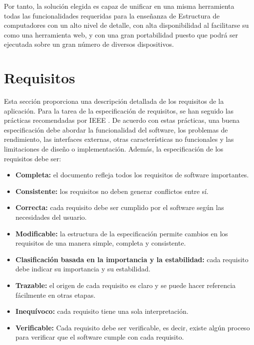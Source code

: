 Por tanto, la solución elegida es capaz de unificar en una misma herramienta todas las funcionalidades requeridas para la enseñanza de Estructura de computadores con un alto nivel de detalle, con alta disponibilidad al facilitarse su como una herramienta web, y con una gran portabilidad puesto que podrá ser ejecutada sobre un gran número de diversos dispositivos.


\section{Requisitos}
\label{sec:requirements}

Esta sección proporciona una descripción detallada de los requisitos de la aplicación. Para la tarea de la especificación de requisitos, se han seguido las prácticas recomendadas por IEEE \cite{ieee1998}. De acuerdo con estas prácticas, una buena especificación debe abordar la funcionalidad del software, los problemas de rendimiento, las interfaces externas, otras características no funcionales y las limitaciones de diseño o implementación.
Además, la especificación de los requisitos debe ser:

\begin{itemize}

\item \textbf{Completa:} el documento refleja todos los requisitos de software importantes.

\item \textbf{Consistente:} los requisitos no deben generar conflictos entre sí.

\item \textbf{Correcta:} cada requisito debe ser cumplido por el software según las necesidades del usuario.


\item \textbf{Modificable:} la estructura de la especificación permite cambios en los requisitos de una manera simple, completa y consistente.

\item \textbf{Clasificación basada en la importancia y la estabilidad:} cada requisito debe indicar su importancia y su estabilidad.

\item \textbf{Trazable:} el origen de cada requisito es claro y se puede hacer referencia fácilmente en otras etapas.

\item \textbf{Inequívoco:} cada requisito tiene una sola interpretación.

\item \textbf{Verificable:} Cada requisito debe ser verificable, es decir, existe algún proceso para verificar que el software cumple con cada requisito.

\end{itemize}

